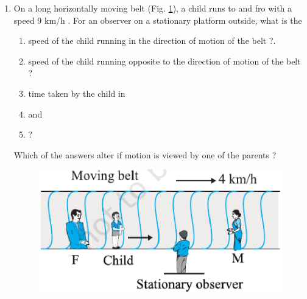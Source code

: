 \begin{enumerate}[label=\arabic*.,ref=\thesection.\theenumi]
\item  On a long horizontally moving belt (Fig. \ref{fig:3.26}), a child runs to and fro with a speed 9 km/h
. For an observer on a
stationary platform outside, what is the 
\begin{enumerate}
\item  speed of the child running in the direction of motion of the belt ?. 
\item  speed of the child running opposite to the direction of motion of the belt ? 
\item  time taken by the child in \item and \item ? 
\end{enumerate}
Which of the answers alter if motion is viewed by one of the parents ?
\begin{figure}[!ht]
\centering
\includegraphics[width=\columnwidth]{./figs/11-1-3-26.eps}
\caption{}
\label{fig:3.26}
\end{figure}


\end{enumerate}
